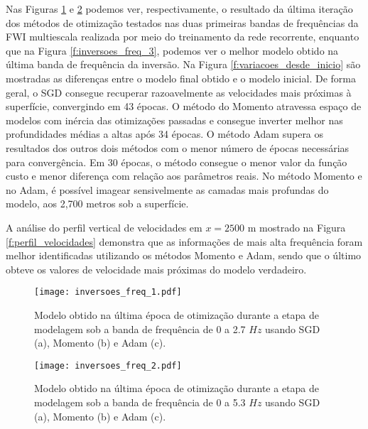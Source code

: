     Nas Figuras \ref{f:inversoes_freq_1} e \ref{f:inversoes_freq_2} podemos ver, respectivamente, o resultado da última iteração dos métodos de otimização testados nas duas primeiras bandas de frequências da FWI multiescala realizada por meio do treinamento da rede recorrente, enquanto que na Figura \ref{f:inversoes_freq_3}, podemos ver o melhor modelo obtido na última banda de frequência da inversão. Na Figura \ref{f:variacoes_desde_inicio} são mostradas as diferenças entre o modelo final obtido e o modelo inicial. De forma geral, o SGD consegue recuperar razoavelmente as velocidades mais próximas à superfície, convergindo em 43 épocas. O método do Momento atravessa espaço de modelos com inércia das otimizações passadas e consegue inverter melhor nas profundidades médias a altas após 34 épocas. O método Adam supera os resultados dos outros dois métodos com o menor número de épocas necessárias para convergência. Em 30 épocas, o método consegue o menor valor da função custo e menor diferença com relação aos parâmetros reais. No método Momento e no Adam, é possível imagear sensivelmente as camadas mais profundas do modelo, aos 2,700 metros sob a superfície.

    A análise do perfil vertical de velocidades em $x=2500$ m mostrado na Figura \ref{f:perfil_velocidades} demonstra que as informações de mais alta frequência foram melhor identificadas utilizando os métodos Momento e Adam, sendo que o último obteve os valores de velocidade mais próximas do modelo verdadeiro.

    \begin{figure}
      \begin{center}
        \texttt{[image: inversoes\_freq\_1.pdf]}
      \end{center}
      \caption{Modelo obtido na última época de otimização durante a etapa de modelagem sob a banda de frequência de 0 a 2.7 $Hz$ usando SGD (a), Momento (b) e Adam (c).}
      \label{f:inversoes_freq_1}
    \end{figure}

    \begin{figure}
      \begin{center}
        \texttt{[image: inversoes\_freq\_2.pdf]}
      \end{center}
      \caption{Modelo obtido na última época de otimização durante a etapa de modelagem sob a banda de frequência de 0 a 5.3 $Hz$ usando SGD (a), Momento (b) e Adam (c).}
      \label{f:inversoes_freq_2}
    \end{figure}

